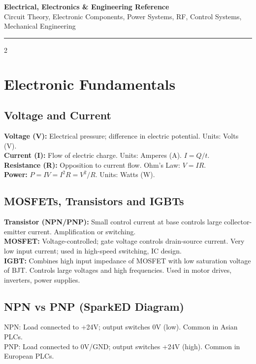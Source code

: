 \documentclass[10pt,a4paper]{article}
\begin{document}
\begin{center}
{\LARGE\bfseries\color{accent} Electrical, Electronics \& Engineering Reference}\\[4pt]
{\small Circuit Theory, Electronic Components, Power Systems, RF, Control Systems, Mechanical Engineering}
\end{center}
\vspace{4pt}\hrule\vspace{6pt}

\begin{multicols}{2}

\section{Electronic Fundamentals}

\subsection{Voltage and Current}
\textbf{Voltage (V):} Electrical pressure; difference in electric potential. Units: Volts (V).\\
\textbf{Current (I):} Flow of electric charge. Units: Amperes (A). $I = Q/t$.\\
\textbf{Resistance (R):} Opposition to current flow. Ohm's Law: $V = IR$.\\
\textbf{Power:} $P = IV = I^2R = V^2/R$. Units: Watts (W).

\subsection{MOSFETs, Transistors and IGBTs}
\textbf{Transistor (NPN/PNP):} Small control current at base controls large collector-emitter current. Amplification or switching.\\
\textbf{MOSFET:} Voltage-controlled; gate voltage controls drain-source current. Very low input current; used in high-speed switching, IC design.\\
\textbf{IGBT:} Combines high input impedance of MOSFET with low saturation voltage of BJT. Controls large voltages and high frequencies. Used in motor drives, inverters, power supplies.

\subsection{NPN vs PNP (SparkED Diagram)}
NPN: Load connected to +24V; output switches 0V (low). Common in Asian PLCs.\\
PNP: Load connected to 0V/GND; output switches +24V (high). Common in European PLCs.


\end{multicols}
\end{document}

